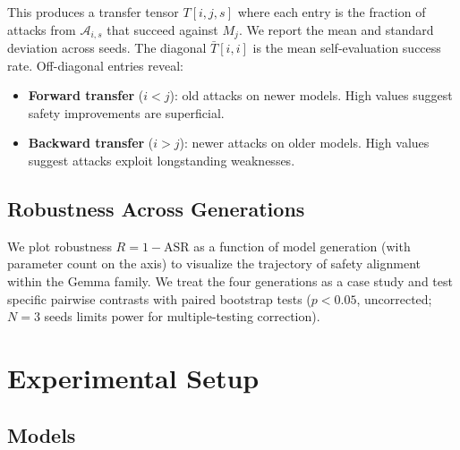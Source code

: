 \documentclass{article}
\begin{document}
This produces a transfer tensor $T[i,j,s]$ where each entry is the
fraction of attacks from $\mathcal{A}_{i,s}$ that succeed against $M_j$.
We report the mean and standard deviation across seeds.
The diagonal $\bar{T}[i,i]$ is the mean self-evaluation success rate.
Off-diagonal entries reveal:
\begin{itemize}
    \item \textbf{Forward transfer} ($i < j$): old attacks on newer models.
          High values suggest safety improvements are superficial.
    \item \textbf{Backward transfer} ($i > j$): newer attacks on older
          models. High values suggest attacks exploit longstanding weaknesses.
\end{itemize}

\subsection{Robustness Across Generations}
\label{sec:method:scaling}

We plot robustness $R = 1 - \text{ASR}$ as a function of model
generation (with parameter count on the axis) to visualize the
trajectory of safety alignment within the Gemma family. We treat the
four generations as a case study and test specific pairwise
contrasts with paired bootstrap tests ($p < 0.05$, uncorrected;
$N = 3$ seeds limits power for multiple-testing correction).

\section{Experimental Setup}
\label{sec:setup}

\subsection{Models}
\end{document}
